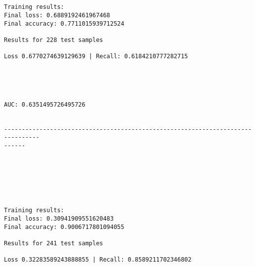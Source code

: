 \documentclass[11pt]{article}
\begin{document}
    \begin{center}
    \end{center}
    { \hspace*{\fill} \\}
    
    \begin{Verbatim}[commandchars=\\\{\}]

Training results:
Final loss: 0.6889192461967468
Final accuracy: 0.7711015939712524

Results for 228 test samples

Loss 0.6770274639129639 | Recall: 0.6184210777282715



    \end{Verbatim}

    \begin{center}
    \end{center}
    { \hspace*{\fill} \\}
    
    \begin{Verbatim}[commandchars=\\\{\}]
AUC: 0.6351495726495726


--------------------------------------------------------------------------------
------


    \end{Verbatim}

    \begin{center}
    \end{center}
    { \hspace*{\fill} \\}
    
    \begin{center}
    \end{center}
    { \hspace*{\fill} \\}
    
    \begin{Verbatim}[commandchars=\\\{\}]

Training results:
Final loss: 0.30941909551620483
Final accuracy: 0.9006717801094055

Results for 241 test samples

Loss 0.32283589243888855 | Recall: 0.8589211702346802



    \end{Verbatim}
\end{document}
